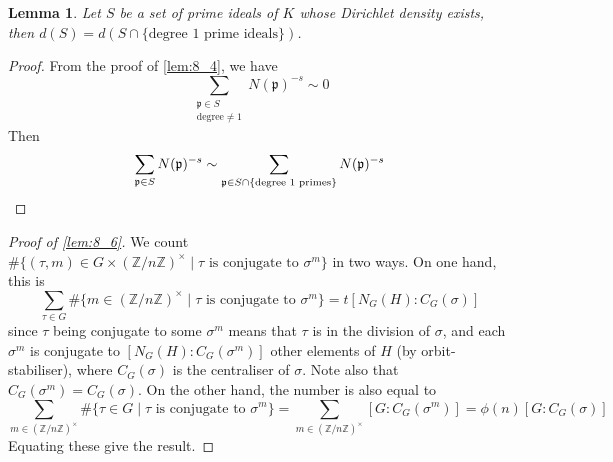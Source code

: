 \documentclass[11pt]{article}
\theoremstyle{definition}
\theoremstyle{plain}
\newtheorem{lemma}[definition]{Lemma}
\theoremstyle{remark}
\newcommand{\ZZ}{\mathbb{Z}}
\newcommand{\fp}{\mathfrak{p}}
\begin{document}
\begin{lemma}\label{lem:8_9}
    Let $S$ be a set of prime ideals of $K$ whose Dirichlet density exists, then $d(S) = d(S \cap \{\text{degree } 1 \text{ prime ideals}\})$.
\end{lemma}
\begin{proof}
    From the proof of \autoref{lem:8_4}, we have
    \begin{equation*}
        \sum_{\substack{\fp \in S \\ \text{degree} \neq 1}} N(\fp)^{-s} \sim 0
    \end{equation*}
    Then
    \begin{equation*}
        \sum_{\fp \in S} N(\fp)^{-s} \sim \sum_{\fp \in S \cap \{\text{degree } 1 \text{ primes}\}} N(\fp)^{-s} \qedhere
    \end{equation*}
\end{proof}

\begin{proof}[Proof of \autoref{lem:8_6}]
    We count $\#\{(\tau, m) \in G \times (\ZZ/n\ZZ)^\times \mid \tau \text{ is conjugate to } \sigma^m\}$ in two ways. On one hand, this is
    \begin{equation*}
        \sum_{\tau \in G} \#\{m \in (\ZZ/n\ZZ)^\times \mid \tau \text{ is conjugate to } \sigma^m\} = t [N_G(H) : C_G(\sigma)]
    \end{equation*}
    since $\tau$ being conjugate to some $\sigma^m$ means that $\tau$ is in the division of $\sigma$, and each $\sigma^m$ is conjugate to $[N_G(H) : C_G(\sigma^m)]$ other elements of $H$ (by orbit-stabiliser), where $C_G(\sigma)$ is the centraliser of $\sigma$. Note also that $C_G(\sigma^m) = C_G(\sigma)$. On the other hand, the number is also equal to
    \begin{equation*}
        \sum_{m \in (\ZZ/n\ZZ)^\times} \#\{\tau \in G \mid \tau \text{ is conjugate to } \sigma^m\} = \sum_{m \in (\ZZ/n\ZZ)^\times} [G : C_G(\sigma^m)] = \phi(n) [G : C_G(\sigma)]
    \end{equation*}
    Equating these give the result.
\end{proof}
\end{document}
